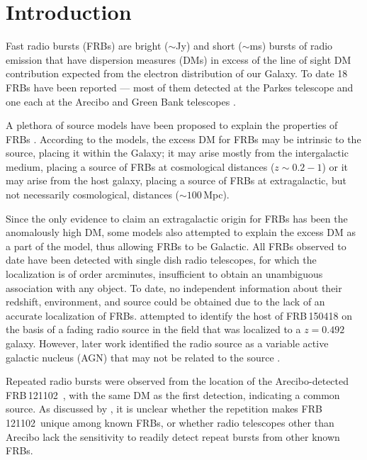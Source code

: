 \documentclass[twocolumn]{aastex61}
\def \frb {FRB\,121102}
\begin{document}

\section{Introduction}
 \label{sec:intro}
Fast radio bursts (FRBs) are bright ($\sim$Jy) and short ($\sim$ms) bursts of radio emission that have dispersion measures (DMs) in excess of the line of sight DM contribution expected from the electron distribution of our Galaxy. To date 18 FRBs have been reported
 --- most of them detected at the Parkes telescope \citep{lbm+07,tsb+13,bb14,kskl12,rsj15,pbb+15,kjb+16,cpk+16,rsb+16} and one each at the Arecibo \citep{sch+14} and Green Bank telescopes \citep{mls+15}. 

A plethora of source models have been proposed to explain the properties of FRBs \citep[see e.g.][for a brief review]{katz16}. According to the models, the excess DM for FRBs may be intrinsic to the source, placing it within the Galaxy; it may arise mostly from the intergalactic medium, placing a source of FRBs at cosmological distances ($z\sim0.2-1$) or it may arise from the host galaxy, placing a source of FRBs at extragalactic, but not necessarily cosmological, distances ($\sim100$\,Mpc).

Since the only evidence to claim an extragalactic origin for FRBs has been the anomalously high DM, some models also attempted to explain the excess DM as a part of the model, thus allowing FRBs to be Galactic. All FRBs observed to date have been detected with single dish radio telescopes, for which the localization is of order arcminutes, insufficient to obtain an unambiguous association with any object. To date, no independent information about their redshift, environment, and source could be obtained due to the lack of an accurate localization of FRBs. \citet{kjb+16} attempted to identify the host of FRB\,150418 on the basis of a fading radio source in the field that was localized to a $z=0.492$ galaxy. However, later work identified the radio source as a variable active galactic nucleus (AGN) that may not be related to the source \citep{wb16,bbt+16,gmg+16,jkb+16}.

 Repeated radio bursts were observed from the location of the Arecibo-detected \frb\ \citep{ssh+16a,ssh+16b}, with the same DM as the first detection, indicating a common source. As discussed by \citet{ssh+16a}, it is unclear whether the repetition makes \frb\ unique among known FRBs, or whether radio telescopes other than Arecibo lack the sensitivity to readily detect repeat bursts from other known FRBs.
\end{document}
